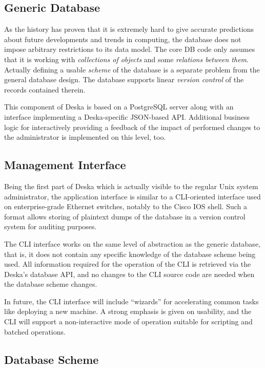 \documentclass[a4paper]{jpconf}
\begin{document}
\subsection{Generic Database}

As the history has proven that it is extremely hard to give accurate predictions about future developments and trends in computing,
the database does not impose arbitrary restrictions to its data model.  The core DB code only assumes that it is working with {\em
collections of objects} and some {\em relations between them}. Actually defining a usable {\em scheme} of the database is a separate
problem from the general database design.  The database supports linear {\em version control} of the records contained therein.

This component of Deska is based on a PostgreSQL server along with an interface implementing a Deska-specific JSON-based API.
Additional business logic for interactively providing a feedback of the impact of performed changes to the administrator is implemented
on this level, too.

\subsection{Management Interface}

Being the first part of Deska which is actually visible to the regular Unix system administrator, the application interface is similar
to a CLI-oriented interface used on enterprise-grade Ethernet switches, notably to the Cisco IOS shell.  Such a format allows storing
of plaintext dumps of the database in a version control system for auditing purposes.

The CLI interface works on the same level of abstraction as the generic database, that is, it does not contain any specific knowledge
of the database scheme being used.  All information required for the operation of the CLI is retrieved via the Deska's database API,
and no changes to the CLI source code are needed when the database scheme changes.

In future, the CLI interface will include ``wizards'' for accelerating common tasks like deploying a new machine.  A strong emphasis is
given on usability, and the CLI will support a non-interactive mode of operation suitable for scripting and batched operations.

\subsection{Database Scheme}
\end{document}

